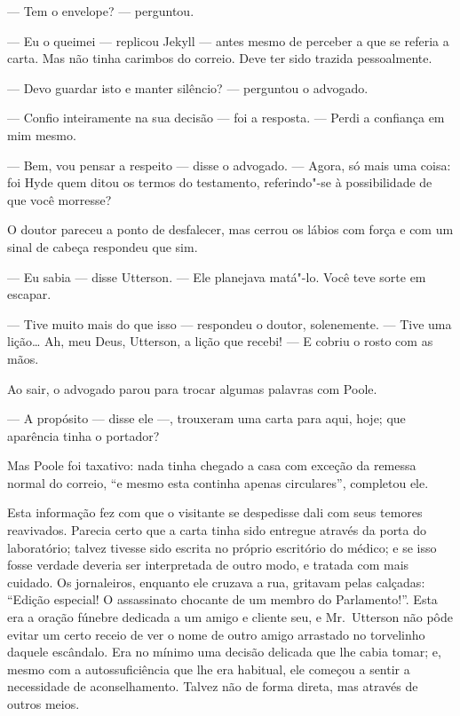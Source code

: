 --- Tem o envelope? --- perguntou.

--- Eu o queimei --- replicou Jekyll --- antes  mesmo de perceber a que se
referia a carta.  Mas não tinha carimbos do correio.  Deve ter sido
trazida pessoalmente.

--- Devo guardar isto e manter silêncio? --- perguntou o advogado.

--- Confio inteiramente na sua decisão --- foi a resposta. --- Perdi a
confiança em mim mesmo.

--- Bem, vou pensar a respeito --- disse o advogado. --- Agora, só mais uma
coisa: foi Hyde quem ditou os termos do testamento, referindo"-se à
possibilidade de que você morresse?

O doutor pareceu a ponto de desfalecer, mas cerrou os lábios com força e
com um sinal de cabeça respondeu que sim.

--- Eu sabia --- disse Utterson. --- Ele planejava matá"-lo.  Você teve sorte
em escapar. 

--- Tive muito mais do que isso --- respondeu o doutor, solenemente. ---
Tive uma lição\ldots{}  Ah, meu Deus, Utterson, a lição que recebi!  ---  E
cobriu o rosto com as mãos.

Ao sair, o advogado parou para trocar algumas palavras com Poole.

--- A propósito --- disse ele ---, trouxeram uma carta para aqui, hoje; que
aparência tinha o portador?

Mas Poole foi taxativo: nada tinha chegado a casa com exceção da remessa
normal do correio, “e mesmo esta continha apenas circulares”, completou
ele.

Esta informação fez com que o visitante se despedisse dali com seus
temores reavivados.  Parecia certo que a carta tinha sido entregue
através da porta do laboratório; talvez tivesse sido escrita no próprio
escritório do médico; e se isso fosse verdade deveria ser interpretada
de outro modo, e tratada com mais cuidado.  Os jornaleiros, enquanto
ele cruzava a rua, gritavam pelas calçadas: “Edição especial!  O
assassinato chocante de um membro do Parlamento!”.  Esta era a oração
fúnebre dedicada a um amigo e cliente seu, e Mr.~Utterson não pôde
evitar um certo receio de ver o nome de outro amigo arrastado no
torvelinho daquele escândalo.  Era no mínimo uma decisão delicada que
lhe cabia tomar; e, mesmo com a autossuficiência que lhe era habitual,
ele começou a sentir a necessidade de aconselhamento.  Talvez não de
forma direta, mas através de outros meios.

